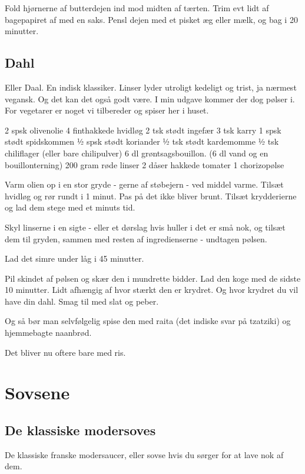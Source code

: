\documentclass[
]{book}
\begin{document}
Fold hjørnerne af butterdejen ind mod midten af tærten. Trim
evt lidt af bagepapiret af med en saks. Pensl dejen
med et pisket æg eller mælk, og bag i 20 minutter.

\section{Dahl}\label{dahl-1}

Eller Daal. En indisk klassiker. Linser lyder utroligt kedeligt og trist, ja nærmest vegansk. Og det kan det også godt være. I min udgave kommer der dog pølser i. For vegetarer er noget vi tilbereder og spiser her i huset.

2 spsk olivenolie
4 finthakkede hvidløg
2 tsk stødt ingefær
3 tsk karry
1 spsk stødt spidskommen
½ spsk stødt koriander
½ tsk stødt kardemomme
½ tsk chiliflager (eller bare chilipulver)
6 dl grøntsagsbouillon. (6 dl vand og en bouillonterning)
200 gram røde linser
2 dåser hakkede tomater
1 chorizopølse

Varm olien op i en stor gryde - gerne af støbejern - ved middel varme. Tilsæt hvidløg og rør rundt i 1 minut. Pas på det ikke bliver brunt. Tilsæt krydderierne og lad dem stege med et minuts tid.

Skyl linserne i en sigte - eller et dørslag hvis huller i det er små nok, og tilsæt dem til gryden, sammen med resten af ingredienserne - undtagen pølsen.

Lad det simre under låg i 45 minutter.

Pil skindet af pølsen og skær den i mundrette bidder. Lad den koge med de sidste 10 minutter. Lidt afhængig af hvor stærkt den er krydret. Og hvor krydret du vil have din dahl. Smag til med slat og peber.

Og så bør man selvfølgelig spise den med raita (det indiske svar på tzatziki) og hjemmebagte naanbrød.

Det bliver nu oftere bare med ris.

\chapter{Sovsene}\label{sovsene}

\section{De klassiske modersoves}\label{de-klassiske-modersoves}

De klassiske franske modersaucer, eller sovse hvis du sørger for at lave nok af dem.
\end{document}
